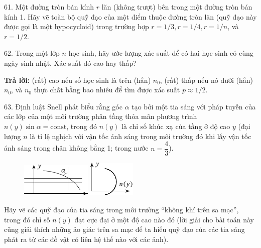 \begin{problem}{61.}
	Một đường tròn bán kính $r$ lăn (không trượt) bên trong một đường tròn bán kính 1.
	Hãy vẽ toàn bộ quỹ đạo của một điểm thuộc đường tròn lăn (quỹ đạo này được gọi là một hypocycloid) trong trường hợp $r=1/3, r=1/4, r=1/n$, và $r=1/2$. 
\end{problem}

\begin{problem}{62.}
	Trong một lớp $n$ học sinh, hãy ước lượng xác suất để có  hai học sinh có cùng ngày sinh nhật. 
	Xác suất đó cao hay thấp?

	\textbf{Trả lời:} (rất) cao nếu số học sinh là trên (hẳn) $n_0$, (rất) thấp nếu nó dưới (hẳn) $n_0$, và $n_0$ thực chất bằng bao nhiêu để tìm được xác suất $p\approx 1/2$. 
\end{problem}

\begin{problem}{63.}
	Định luật Snell phát biểu rằng góc $\alpha$ tạo bởi một tia sáng với pháp tuyến của các lớp của một môi trường phân tầng thỏa mãn phương trình $n(y) \sin \alpha =\mbox{const}$, trong đó $n(y)$ là chỉ số khúc xạ của tầng ở độ cao $y$ (đại lượng $n$ là tỉ lệ nghịch với vận tốc ánh sáng trong môi trường đó khi lấy vận tốc ánh sáng trong chân không bằng 1; trong nước $n=\dfrac{4}{3}$).

	\begin{figure}
	\centering\includegraphics[width=0.3\textwidth]{taskbook-47} 
	\qquad
	\includegraphics[width=0.2\textwidth]{taskbook-471} 
	\end{figure}
	Hãy vẽ các quỹ đạo của tia sáng trong môi trường \enquote{không khí trên sa mạc}, trong đó chỉ số $n(y)$ đạt cực đại ở một độ cao nào đó (lời giải cho bài toán này cũng giải thích những ảo giác trên sa mạc để ta hiểu quỹ đạo của các tia sáng phát ra từ các đồ vật có liên hệ thế nào với các ảnh).
\end{problem}

